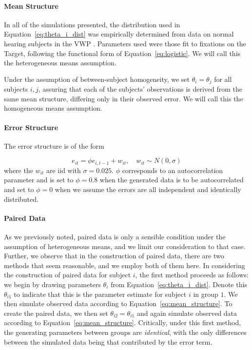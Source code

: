 \documentclass{article}
\begin{document}
\paragraph{Mean Structure} In all of the simulations presented, the distribution used in Equation~\ref{eq:theta_i_dist} was empirically determined from data on normal hearing subjects in the VWP \citep{FarrisTrimble2014}. Parameters used were those fit to fixations on the Target, following the functional form of Equation~\ref{eq:logistic}. We will call this the heterogeneous means assumption.

Under the assumption of between-subject homogeneity, we set $\theta_i = \theta_j$ for all subjects $i,j$, assuring that each of the subjects' observations is derived from the same mean structure, differing only in their observed error. We will call this the homogeneous means assumption.


\paragraph{Error Structure} The error structure is of the form

\begin{equation}
e_{it} = \phi e_{i, t-1} + w_{it}, \quad w_{it} \sim N(0, \sigma)
\end{equation}
where the $w_{it}$ are iid with $\sigma = 0.025$. $\phi$ corresponds to an autocorrelation parameter and is set to $\phi = 0.8$ when the generated data is to be autocorrelated and set to $\phi = 0$ when we assume the errors are all independent and identically distributed. 

\paragraph{Paired Data} As we previously noted, paired data is only a sensible condition under the assumption of heterogeneous means, and we limit our consideration to that case. Further, we observe that in the construction of paired data, there are two methods that seem reasonable, and we employ both of them here. In considering the construction of paired data for subject $i$, the first method proceeds as follows: we begin by drawing parameters $\theta_i$ from Equation~\ref{eq:theta_i_dist}. Denote this $\theta_{i1}$ to indicate that this is the parameter estimate for subject $i$ in group $1$. We then simulate observed data according to Equation~\ref{eq:mean_structure}. To create the paired data, we then set $\theta_{i2} = \theta_{i1}$ and again simulate observed data according to Equation~\ref{eq:mean_structure}. Critically, under this first method, the generating parameters between groups are \textit{identical}, with the only differences between the simulated data being that contributed by the error term.
\end{document}
